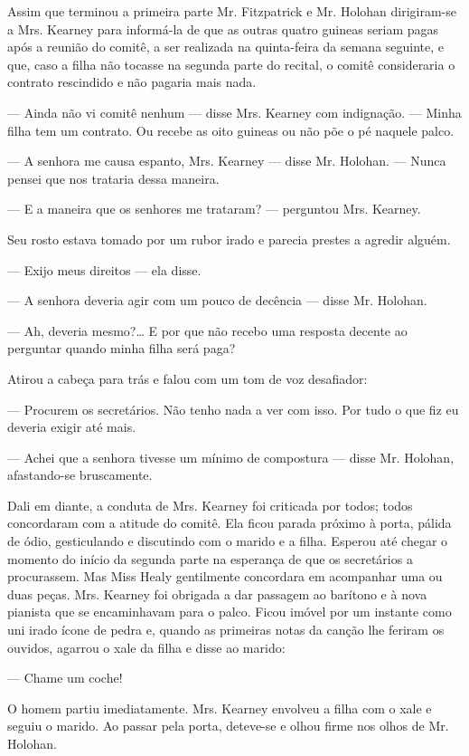 Assim que terminou a primeira parte Mr. Fitzpatrick e Mr. Holohan
dirigiram-se a Mrs. Kearney para informá-la de que as outras quatro
guineas seriam pagas após a reunião do comitê, a ser realizada na
quinta-feira da semana seguinte, e que, caso a filha não tocasse na
segunda parte do recital, o comitê consideraria o contrato
rescindido e não pagaria mais nada.

--- Ainda não vi comitê nenhum --- disse Mrs. Kearney com indignação.
--- Minha filha tem um contrato. Ou recebe as oito guineas ou não põe
o pé naquele palco.

--- A senhora me causa espanto, Mrs. Kearney --- disse Mr. Holohan.
--- Nunca pensei que nos trataria dessa maneira.

--- E a maneira que os senhores me trataram? --- perguntou Mrs.
Kearney.

Seu rosto estava tomado por um rubor irado e parecia prestes a agredir
alguém.

--- Exijo meus direitos --- ela disse.

--- A senhora deveria agir com um pouco de decência --- disse Mr.
Holohan.

--- Ah, deveria mesmo?\ldots{} E por que não recebo uma resposta decente ao
perguntar quando minha filha será paga?

Atirou a cabeça para trás e falou com um tom de voz desafiador:

--- Procurem os secretários. Não tenho nada a ver com isso. Por tudo o
que fiz eu deveria exigir até mais.

--- Achei que a senhora tivesse um mínimo de compostura --- disse Mr.
Holohan, afastando-se bruscamente.

Dali em diante, a conduta de Mrs. Kearney foi criticada por todos;
todos concordaram com a atitude do comitê. Ela ficou parada próximo à
porta, pálida de ódio, gesticulando e discutindo com o marido e a
filha. Esperou até chegar o momento do início da segunda parte na
esperança de que os secretários a procurassem. Mas Miss Healy
gentilmente concordara em acompanhar uma ou duas peças. Mrs. Kearney
foi obrigada a dar passagem ao barítono e à nova pianista que se
encaminhavam para o palco. Ficou imóvel por um instante como uni
irado ícone de pedra e, quando as primeiras notas da canção lhe
feriram os ouvidos, agarrou o xale da filha e disse ao marido:

--- Chame um coche!

O homem partiu imediatamente. Mrs. Kearney envolveu a filha com o xale
e seguiu o marido. Ao passar pela porta, deteve-se e olhou firme nos
olhos de Mr. Holohan.

